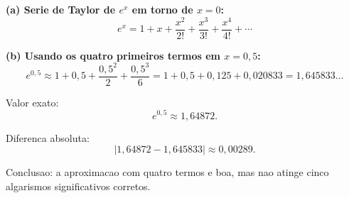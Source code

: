 \textbf{(a) Serie de Taylor de $e^x$ em torno de $x=0$:}
\[
e^x = 1 + x + \frac{x^2}{2!} + \frac{x^3}{3!} + \frac{x^4}{4!} + \cdots
\]

\textbf{(b) Usando os quatro primeiros termos em $x=0{,}5$:}
\[
e^{0{,}5} \approx 1 + 0{,}5 + \frac{0{,}5^2}{2} + \frac{0{,}5^3}{6}
= 1 + 0{,}5 + 0{,}125 + 0{,}020833
= 1{,}645833\ldots
\]

Valor exato:
\[
e^{0{,}5} \approx 1{,}64872.
\]

Diferenca absoluta:
\[
|1{,}64872 - 1{,}645833| \approx 0{,}00289.
\]

Conclusao: a aproximacao com quatro termos e boa, mas nao atinge cinco algarismos significativos corretos.